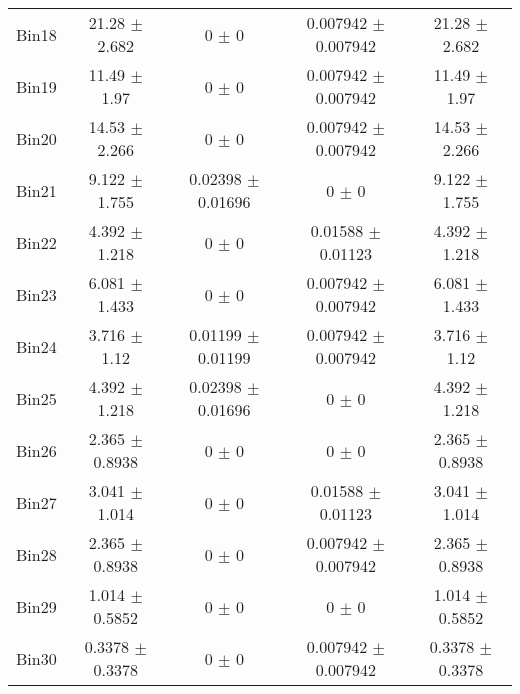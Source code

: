 \begin{tabular}{@{\extracolsep{4pt}}lcccc@{}}
     Bin18 & 21.28 $\pm$ 2.682 & 0 $\pm$ 0 & 0.007942 $\pm$ 0.007942 & 21.28 $\pm$ 2.682 \\ 
     Bin19 & 11.49 $\pm$ 1.97 & 0 $\pm$ 0 & 0.007942 $\pm$ 0.007942 & 11.49 $\pm$ 1.97 \\ 
     Bin20 & 14.53 $\pm$ 2.266 & 0 $\pm$ 0 & 0.007942 $\pm$ 0.007942 & 14.53 $\pm$ 2.266 \\ 
     Bin21 & 9.122 $\pm$ 1.755 & 0.02398 $\pm$ 0.01696 & 0 $\pm$ 0 & 9.122 $\pm$ 1.755 \\ 
     Bin22 & 4.392 $\pm$ 1.218 & 0 $\pm$ 0 & 0.01588 $\pm$ 0.01123 & 4.392 $\pm$ 1.218 \\ 
     Bin23 & 6.081 $\pm$ 1.433 & 0 $\pm$ 0 & 0.007942 $\pm$ 0.007942 & 6.081 $\pm$ 1.433 \\ 
     Bin24 & 3.716 $\pm$ 1.12 & 0.01199 $\pm$ 0.01199 & 0.007942 $\pm$ 0.007942 & 3.716 $\pm$ 1.12 \\ 
     Bin25 & 4.392 $\pm$ 1.218 & 0.02398 $\pm$ 0.01696 & 0 $\pm$ 0 & 4.392 $\pm$ 1.218 \\ 
     Bin26 & 2.365 $\pm$ 0.8938 & 0 $\pm$ 0 & 0 $\pm$ 0 & 2.365 $\pm$ 0.8938 \\ 
     Bin27 & 3.041 $\pm$ 1.014 & 0 $\pm$ 0 & 0.01588 $\pm$ 0.01123 & 3.041 $\pm$ 1.014 \\ 
     Bin28 & 2.365 $\pm$ 0.8938 & 0 $\pm$ 0 & 0.007942 $\pm$ 0.007942 & 2.365 $\pm$ 0.8938 \\ 
     Bin29 & 1.014 $\pm$ 0.5852 & 0 $\pm$ 0 & 0 $\pm$ 0 & 1.014 $\pm$ 0.5852 \\ 
     Bin30 & 0.3378 $\pm$ 0.3378 & 0 $\pm$ 0 & 0.007942 $\pm$ 0.007942 & 0.3378 $\pm$ 0.3378 \\ 
\hline\hline
  \end{tabular}
